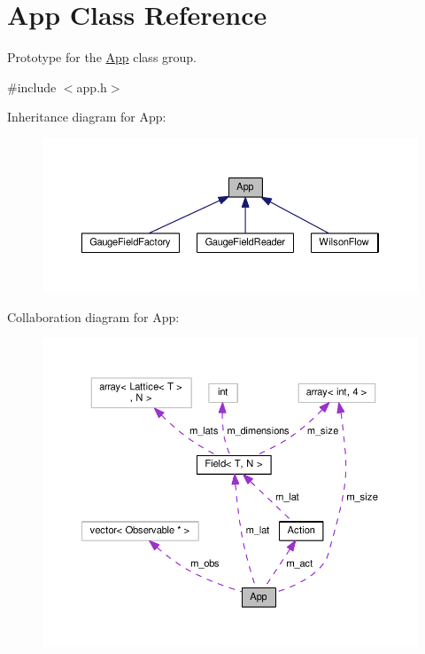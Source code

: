 \hypertarget{classApp}{}\section{App Class Reference}
\label{classApp}


Prototype for the \hyperlink{classApp}{App} class group.  




{\ttfamily \#include $<$app.\+h$>$}



Inheritance diagram for App\+:\nopagebreak
\begin{figure}[H]
\begin{center}
\leavevmode
\includegraphics[width=350pt]{dd/dcc/classApp__inherit__graph}
\end{center}
\end{figure}


Collaboration diagram for App\+:\nopagebreak
\begin{figure}[H]
\begin{center}
\leavevmode
\includegraphics[width=350pt]{d6/d76/classApp__coll__graph}
\end{center}
\end{figure}
